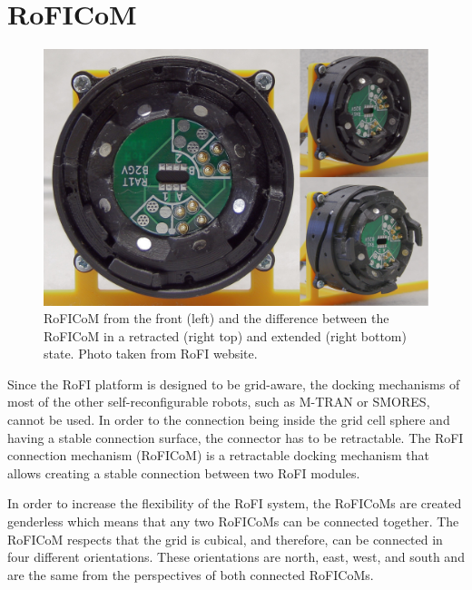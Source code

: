 \documentclass[
  printed, %
  color,   %
  notable, %
  oneside, %
  nolof,   %
  nolot,   %
  nocover,
]{fithesis3}
\begin{document}
\section{RoFICoM}
\label{roficom}

\begin{figure}
    \centering
    \includegraphics[width=\linewidth]{data/connector.jpg}
    \caption{RoFICoM from the front (left) and the difference between the RoFICoM in a retracted (right top) and extended (right bottom) state. Photo taken from RoFI website\cite{rofi-web}.}
    \label{fig:connector}
\end{figure}

Since the RoFI platform is designed to be grid-aware, the docking mechanisms of most of the other self-reconfigurable robots, such as M-TRAN\cite{mtran} or SMORES\cite{smores}, cannot be used.
In order to the connection being inside the grid cell sphere and having a stable connection surface, the connector has to be retractable.
The RoFI connection mechanism (RoFICoM) is a retractable docking mechanism that allows creating a stable connection between two RoFI modules.

In order to increase the flexibility of the RoFI system, the RoFICoMs are created genderless which means that any two RoFICoMs can be connected together.
The RoFICoM respects that the grid is cubical, and therefore, can be connected in four different orientations.
These orientations are north, east, west, and south and are the same from the perspectives of both connected RoFICoMs.
\end{document}

